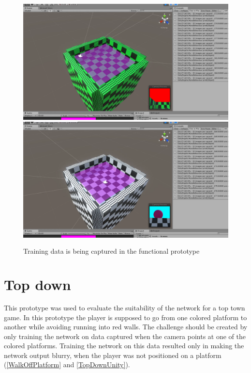 \begin{figure}[p]
  \centering
  \includegraphics[width=\imgWidth]{images/workflow/Functional1.png} \\[\picVdist]
  \includegraphics[width=\imgWidth]{images/workflow/Functional2.png}
  \caption{Training data is being captured in the functional prototype}
  \label{FunctionalCapture}
\end{figure}

\section{Top down}
This prototype was used to evaluate the suitability of the network for a top town game. In this prototype the player is supposed to go from one colored platform to another while avoiding running into red walls. The challenge should be created by only training the network on data captured when the camera points at one of the colored platforms. Training the network on this data resulted only in making the network output blurry, when the player was not positioned on a platform (\cref{WalkOffPlatform} and \cref{TopDownUnity}).

